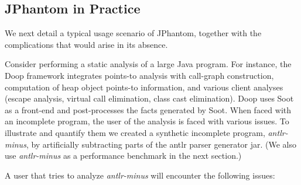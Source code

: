 \subsection{JPhantom in Practice}

We next detail a typical usage scenario of JPhantom, together with the
complications that would arise in its absence.

Consider performing a static analysis of a large Java program. For
instance, the Doop framework \cite{BS-OOPSLA09,hybrid-pldi13}
integrates points-to analysis with call-graph construction,
computation of heap object points-to information, and various client
analyses (escape analysis, virtual call elimination, class cast
elimination). Doop uses Soot as a front-end and post-processes the
facts generated by Soot. When faced with an incomplete program, the
user of the analysis is faced with various issues. To illustrate and
quantify them we created a synthetic incomplete
program, \emph{antlr-minus}, by artificially subtracting parts of the
antlr parser generator jar. (We also use \emph{antlr-minus} as a
performance benchmark in the next section.)

A user that tries to analyze \emph{antlr-minus} will encounter the
following issues:

